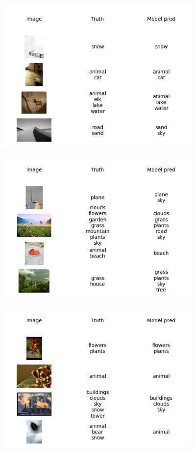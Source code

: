 \documentclass{udstu}
\begin{document}
\begin{figure}[!ht]
	\centering
	\includegraphics[width=0.9\textwidth]{PNG/showcase-225}
	\caption{}
\end{figure}

\begin{figure}[!ht]
	\centering
	\includegraphics[width=0.9\textwidth]{PNG/showcase-250}
	\caption{}
\end{figure}

\begin{figure}[!ht]
	\centering
	\includegraphics[width=0.9\textwidth]{PNG/showcase-275}
	\caption{}
\end{figure}
\end{document}
